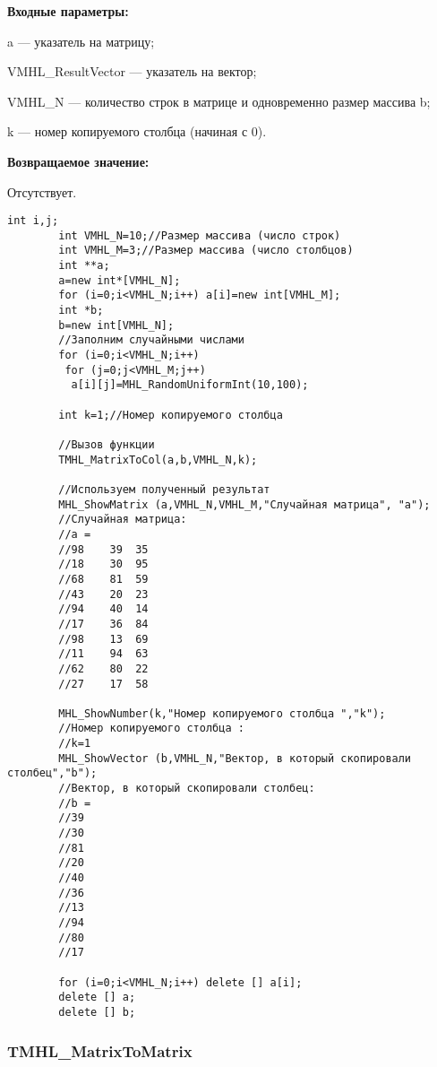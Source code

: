 \documentclass[a4paper,12pt]{article}
\begin{document}
\textbf{Входные параметры:}  
 
a --- указатель на матрицу;
 
VMHL\_ResultVector --- указатель на вектор;
 
VMHL\_N --- количество строк в матрице и одновременно размер массива b;
 
k --- номер копируемого столбца (начиная с 0).

\textbf{Возвращаемое значение:}

Отсутствует.


\begin{lstlisting}[label=code_use_TMHL_MatrixToCol,caption=Пример использования]
        int i,j;
        int VMHL_N=10;//Размер массива (число строк)
        int VMHL_M=3;//Размер массива (число столбцов)
        int **a;
        a=new int*[VMHL_N];
        for (i=0;i<VMHL_N;i++) a[i]=new int[VMHL_M];
        int *b;
        b=new int[VMHL_N];
        //Заполним случайными числами
        for (i=0;i<VMHL_N;i++)
         for (j=0;j<VMHL_M;j++)
          a[i][j]=MHL_RandomUniformInt(10,100);

        int k=1;//Номер копируемого столбца
        
        //Вызов функции
        TMHL_MatrixToCol(a,b,VMHL_N,k);

        //Используем полученный результат
        MHL_ShowMatrix (a,VMHL_N,VMHL_M,"Случайная матрица", "a");
        //Случайная матрица:
        //a =	
        //98	39	35
        //18	30	95
        //68	81	59
        //43	20	23
        //94	40	14
        //17	36	84
        //98	13	69
        //11	94	63
        //62	80	22
        //27	17	58
        
        MHL_ShowNumber(k,"Номер копируемого столбца ","k");
        //Номер копируемого столбца :
        //k=1
        MHL_ShowVector (b,VMHL_N,"Вектор, в который скопировали столбец","b");
        //Вектор, в который скопировали столбец:
        //b =	
        //39
        //30
        //81
        //20
        //40
        //36
        //13
        //94
        //80
        //17
        
        for (i=0;i<VMHL_N;i++) delete [] a[i];
        delete [] a;
        delete [] b;
\end{lstlisting}

\subsubsection{TMHL\_MatrixToMatrix}\label{TMHL_MatrixToMatrix}
\end{document}
